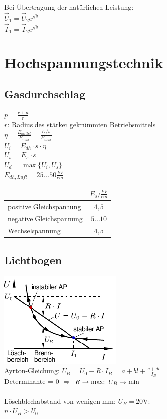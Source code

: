 \documentclass[fs, footer]{latex4ei}
\begin{document}
\begin{multicols}{4}
    Bei Übertragung der natürlichen Leistung: \\
    $\vec U_1 = \vec U_2 e^{j \beta l}$ \\
    $\vec I_1 = \vec I_2 e^{j \beta l}$ \\


    \section{Hochspannungstechnik}
    \subsection{Gasdurchschlag}
    $p = \frac{r + d}{r}$ \\
    $r$: Radius des stärker gekrümmten Betriebsmittels \\
    $\eta = \frac{E_{mittel}}{E_{max}} = \frac{U/s}{E_{max}}$ \\
    $U_i = E_{dh} \cdot s \cdot \eta$ \\
    $U_s = E_s \cdot s$ \\
    $U_d = \max\{U_i, U_s\}$ \\
    $E_{dh,Luft} = 25 \hdots 50 \frac{kV}{cm}$ \\
    \begin{tabular}{l|c}
                                & $E_s / \frac{kV}{cm}$ \\ \hline
        positive Gleichspannung & $4,5$                 \\ \hline
        negative Gleichspannung & $5 \hdots 10$         \\ \hline
        Wechselspannung         & $4,5$
    \end{tabular}

    \subsection{Lichtbogen}
    \includegraphics{./img/Lichtbogen.pdf}\\
    Ayrton-Gleichung: $U_B = U_0 - R \cdot I_B = a + bl + \frac{c+dl}{I_B}$\\
    Determinante = 0 \quad $\Longrightarrow$ \quad $R \rightarrow \text{max};\ U_{B} \rightarrow \text{min}$\\
    \\
    Löschblechabstand von wenigen mm: $U_B = 20$V:\\
    $n \cdot U_B > U_0$






\end{multicols}

\end{document}
